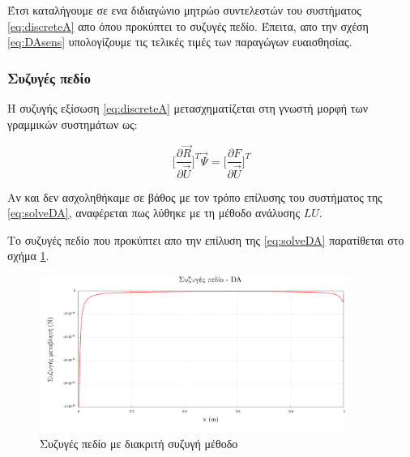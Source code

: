 \vspace{12pt}
Έτσι καταλήγουμε σε ενα διδιαγώνιο μητρώο συντελεστών του συστήματος \ref{eq:discreteA} απο όπου προκύπτει το συζυγές πεδίο. Έπειτα, απο την σχέση \ref{eq:DAsens} υπολογίζουμε τις τελικές τιμές των παραγώγων ευαισθησίας.

\subsubsection{Συζυγές πεδίο} 

Η συζυγής εξίσωση \ref{eq:discreteA} μετασχηματίζεται στη γνωστή μορφή των γραμμικών συστημάτων ως:

\begin{equation}
    \Bigg[\dfrac{\partial\vec{R}}{\partial\vec{U}}\Bigg]^T\vec{\Psi} = \Bigg[\dfrac{\partial F}{\partial\vec{U}}\Bigg]^T
    \label{eq:solveDA}
\end{equation}

Αν και δεν ασχοληθήκαμε σε βάθος με τον τρόπο επίλυσης του συστήματος της \ref{eq:solveDA}, αναφέρεται πως λύθηκε με τη μέθοδο ανάλυσης $LU$.

Το συζυγές πεδίο που προκύπτει απο την επίλυση της \ref{eq:solveDA} παρατίθεται στο σχήμα \ref{fig:DAfield}.

\begin{figure}[h!]
    \begin{center}
        \includegraphics[width=0.9\textwidth]{figures/DA_field.pdf}
    \end{center}
    \caption{Συζυγές πεδίο με διακριτή συζυγή μέθοδο}
    \label{fig:DAfield}
\end{figure}


